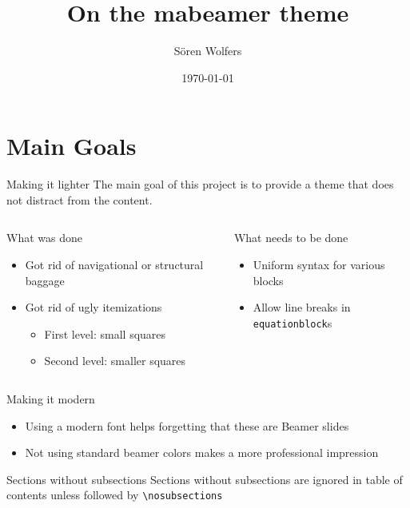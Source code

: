 \documentclass[12pt]{beamer}
\title{On the mabeamer theme}
\date{\today}%
\author[S. Wolfers]{Sören Wolfers}
\begin{document}
\frame{\maketitle}
\matableofcontents

\section{Main Goals}
\nosubsections

\begin{frame}{Making it lighter}
The main goal of this project is to provide a theme that does not distract from the content.
\begin{columns}
	\begin{column}{0.5\textwidth}	
		\begin{block}{What  was done}
		\begin{itemize}
		\item Got rid of navigational or structural baggage
		\item Got rid of ugly itemizations
		\begin{itemize}
		\item First level: small squares
		\item Second level: smaller squares
		\end{itemize}
		\end{itemize}
		\end{block}
	\end{column}
	\begin{column}{0.5\textwidth}
		\begin{block}{What  needs to be done}
		\begin{itemize}
			\item Uniform syntax for various blocks
			\item Allow line breaks in \texttt{equationblock}s
		\end{itemize}
		\end{block}
	\end{column}
\end{columns}
\end{frame}

\begin{frame}{Making it modern}
\begin{itemize}
	\item Using a modern font helps forgetting that these are Beamer slides

	\item Not using {\color{yellow}standard} {\color{blue}beamer} {\color{red}colors} makes a more professional impression
\end{itemize}

\begin{exampleblock}{Sections without subsections}
Sections without subsections are ignored in table of contents unless followed by \texttt{\textbackslash nosubsections}
\end{exampleblock}
\end{frame}
\end{document}
